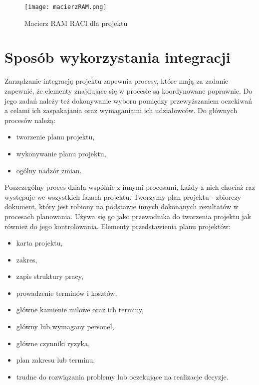 \begin{figure}[!h]
\centering
\texttt{[image: macierzRAM.png]}
\caption{Macierz RAM RACI dla projektu}
\label{fig:macierzRAM}
\end{figure}



\section{Sposób wykorzystania integracji}

Zarządzanie integracją projektu zapewnia procesy, które mają za zadanie zapewnić, że elementy znajdujące się w procesie są koordynowane poprawnie. Do jego zadań należy też dokonywanie wyboru pomiędzy przewyższaniem oczekiwań a celami ich zaspakajania oraz wymaganiami ich udziałowców.
Do głównych procesów należą:

\begin{itemize}
\item tworzenie planu projektu,
\item wykonywanie planu projektu,
\item ogólny nadzór zmian.
\end{itemize}

Poszczególny proces działa wspólnie z innymi procesami, każdy z nich chociaż raz występuje we wszystkich fazach projektu.
Tworzymy plan projektu - zbiorczy dokument, który jest robiony na podstawie innych dokonanych rezultatów w procesach planowania. Używa się go jako przewodnika do tworzenia projektu jak również do jego kontrolowania.
Elementy przedstawienia planu projektów:

\begin{itemize}
\item karta projektu,
\item zakres,
\item zapis struktury pracy,
\item prowadzenie terminów i kosztów,
\item główne kamienie milowe oraz ich terminy,
\item główny lub wymagany personel,
\item główne czynniki ryzyka,
\item plan zakresu lub terminu,
\item trudne do rozwiązania problemy lub oczekujące na realizacje decyzje.
\end{itemize}

